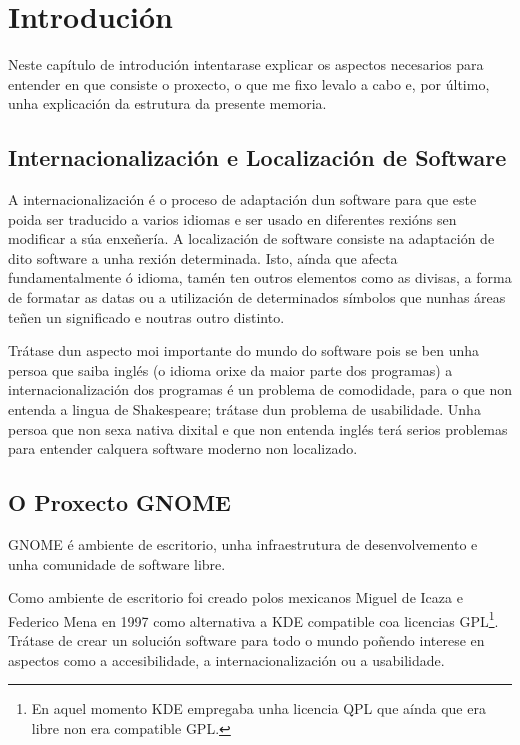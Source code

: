 %
%

\chapter[Introdución]{Introdución}

Neste capítulo de introdución intentarase explicar os aspectos necesarios para entender en que consiste o proxecto, o que me fixo levalo a cabo e, por último, unha explicación da estrutura da presente memoria.

\section{Internacionalización e Localización de Software}
A internacionalización é o proceso de adaptación dun software para que este poida ser traducido a varios idiomas e ser usado en diferentes rexións sen modificar a súa enxeñería. A localización de software consiste na adaptación de dito software a unha rexión determinada. Isto, aínda que afecta fundamentalmente ó idioma, tamén ten outros elementos como as divisas, a forma de formatar as datas ou a utilización de determinados símbolos que nunhas áreas teñen un significado e noutras outro distinto.

Trátase dun aspecto moi importante do mundo do software pois se ben unha persoa que saiba inglés (o idioma orixe da maior parte dos programas) a internacionalización dos programas é un problema de comodidade, para o que non entenda a lingua de Shakespeare; trátase dun problema de usabilidade. Unha persoa que non sexa nativa dixital e que non entenda inglés terá serios problemas para entender calquera software moderno non localizado.

\section{O Proxecto GNOME}
GNOME é ambiente de escritorio, unha infraestrutura de desenvolvemento e unha comunidade de software libre.

Como ambiente de escritorio foi creado polos mexicanos Miguel de Icaza e Federico Mena en 1997 como alternativa a KDE compatible coa licencias GPL\footnote{En aquel momento KDE empregaba unha licencia QPL que aínda que era libre non era compatible GPL.}. Trátase de crear un solución software para todo o mundo poñendo interese en aspectos como a accesibilidade, a internacionalización ou a usabilidade.

